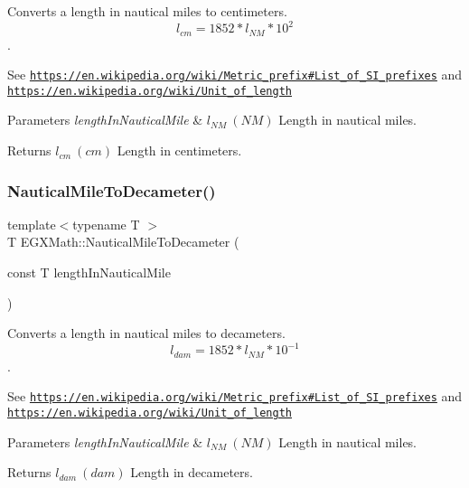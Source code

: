 Converts a length in nautical miles to centimeters. \[ l_{cm}=1852 * l_{NM} * 10^{2} \]. 

See \href{https://en.wikipedia.org/wiki/Metric_prefix#List_of_SI_prefixes}{\tt https\+://en.\+wikipedia.\+org/wiki/\+Metric\+\_\+prefix\#\+List\+\_\+of\+\_\+\+S\+I\+\_\+prefixes} and \href{https://en.wikipedia.org/wiki/Unit_of_length}{\tt https\+://en.\+wikipedia.\+org/wiki/\+Unit\+\_\+of\+\_\+length} 
\begin{DoxyParams}{Parameters}
{\em length\+In\+Nautical\+Mile} & $ l_{NM}\ (NM)$ Length in nautical miles. \\
\hline
\end{DoxyParams}
\begin{DoxyReturn}{Returns}
$ l_{cm}\ (cm)$ Length in centimeters. 
\end{DoxyReturn}
\mbox{\label{group___e_g_x_math-_conversions-_length_conversions-_nautical-_nautical_mile-_s_i_gaec7c0bd4b19a2301d5033e19bac6e6eb}} 
\subsubsection{\texorpdfstring{Nautical\+Mile\+To\+Decameter()}{NauticalMileToDecameter()}}
{\footnotesize\ttfamily template$<$typename T $>$ \\
T E\+G\+X\+Math\+::\+Nautical\+Mile\+To\+Decameter (\begin{DoxyParamCaption}\item[{const T}]{length\+In\+Nautical\+Mile }\end{DoxyParamCaption})}



Converts a length in nautical miles to decameters. \[ l_{dam}=1852 * l_{NM} * 10^{-1} \]. 

See \href{https://en.wikipedia.org/wiki/Metric_prefix#List_of_SI_prefixes}{\tt https\+://en.\+wikipedia.\+org/wiki/\+Metric\+\_\+prefix\#\+List\+\_\+of\+\_\+\+S\+I\+\_\+prefixes} and \href{https://en.wikipedia.org/wiki/Unit_of_length}{\tt https\+://en.\+wikipedia.\+org/wiki/\+Unit\+\_\+of\+\_\+length} 
\begin{DoxyParams}{Parameters}
{\em length\+In\+Nautical\+Mile} & $ l_{NM}\ (NM)$ Length in nautical miles. \\
\hline
\end{DoxyParams}
\begin{DoxyReturn}{Returns}
$ l_{dam}\ (dam)$ Length in decameters. 
\end{DoxyReturn}
\mbox{\label{group___e_g_x_math-_conversions-_length_conversions-_nautical-_nautical_mile-_s_i_gabd0d42a12028a741852737b122d60f28}} 
